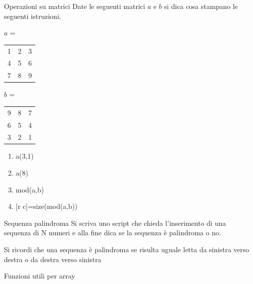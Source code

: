 \documentclass[aspectratio=169]{beamer}
\begin{document}
\begin{frame}{Operazioni su matrici}
Date le seguenti matrici $a$ e $b$ si dica cosa stampano le seguenti istruzioni.

$a$ =
\begin{tabular}{|ccc|}
	\hline
	1&2&3\\
	4&5&6\\
	7&8&9\\
	\hline
\end{tabular}
\hspace{1cm}
$b$ =
\begin{tabular}{|ccc|}
	\hline
	9&8&7\\
	6&5&4\\
	3&2&1\\
	\hline
\end{tabular}

\begin{enumerate}
	\item a(3,1)
	\item a(8)
	\item mod(a,b)
	\item {[r c]}=size(mod(a,b))
\end{enumerate}

\end{frame}


\begin{frame}{Sequenza palindroma}
Si scriva uno script che chieda l’inserimento di una sequenza di N numeri e alla fine dica se la sequenza è palindroma o no.

Si ricordi che una sequenza è palindroma se risulta uguale letta da sinistra verso destra o da destra verso sinistra
\end{frame}

\begin{frame}[fragile]{Funzioni utili per array}
    
\end{frame}
\end{document}
